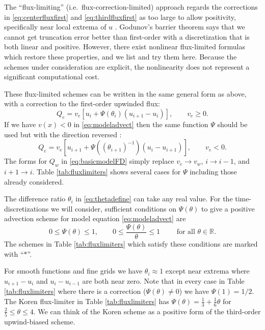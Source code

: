 \documentclass[11pt,final]{amsart}
\newcommand\RR{\mathbb{R}}
\begin{document}
The ``flux-limiting'' (i.e.~flux-correction-limited) approach regards the corrections in \eqref{eq:centerfluxfirst} and \eqref{eq:thirdfluxfirst} as too large to allow positivity, specifically near local extrema of $u$ \citep[section III.1.1]{HundsdorferVerwer2010}.  Godunov's barrier theorem \citep[section I.7.1]{HundsdorferVerwer2010} says that we cannot get truncation error better than first-order with a discretization that is both linear and positive.  However, there exist nonlinear flux-limited formulas which restore these properties, and we list and try them here.  Because the schemes under consideration are explicit, the nonlinearity does not represent a significant computational cost.

These flux-limited schemes can be written in the same general form as above, with a correction to the first-order upwinded flux:
\begin{equation}
Q_e = v_e \left[u_i + \Psi(\theta_i) (u_{i+1} - u_i)\right], \qquad v_e \ge 0. \label{eq:fluxlimiterform}
\end{equation}
If we have $v(x)<0$ in \eqref{eq:modeladvect} then the same function $\Psi$ should be used but with the direction reversed \citep[section III.1.1]{HundsdorferVerwer2010}:
\begin{equation}
Q_e = v_e \left[u_{i+1} + \Psi\left((\theta_{i+1})^{-1}\right) (u_i - u_{i+1})\right], \qquad v_e < 0. \label{eq:fluxlimiterformreversed}
\end{equation}
The forms for $Q_w$ in \eqref{eq:basicmodelFD} simply replace $v_e \to v_w$, $i\to i-1$, and $i+1\to i$.  Table \ref{tab:fluxlimiters} shows several cases for $\Psi$ including those already considered.

The difference ratio $\theta_i$ in \eqref{eq:thetadefine} can take any real value.  For the time-discretizations we will consider, sufficient conditions on $\Psi(\theta)$ to give a positive advection scheme for model equation \eqref{eq:modeladvect} are
\begin{equation}
0 \le \Psi(\theta) \le 1, \qquad 0 \le \frac{\Psi(\theta)}{\theta} \le 1 \qquad \text{ for all } \theta \in \RR.
\end{equation}
The schemes in Table \ref{tab:fluxlimiters} which satisfy these conditions are marked with ``$\ast$''.

For smooth functions and fine grids we have $\theta_i\approx 1$ except near extrema where $u_{i+1} - u_i$ and $u_i - u_{i-1}$ are both near zero.  Note that in every case in Table \ref{tab:fluxlimiters} where there is a correction ($\Psi(\theta)\ne 0$) we have $\Psi(1)=1/2$.  The Koren flux-limiter in Table \ref{tab:fluxlimiters} \citep{HundsdorferVerwer2010} has $\Psi(\theta) = \frac{1}{3}+\frac{1}{6} \theta$ for $\frac{2}{5} \le \theta \le 4$.  We can think of the Koren scheme as a positive form of the third-order upwind-biased scheme.
\end{document}
